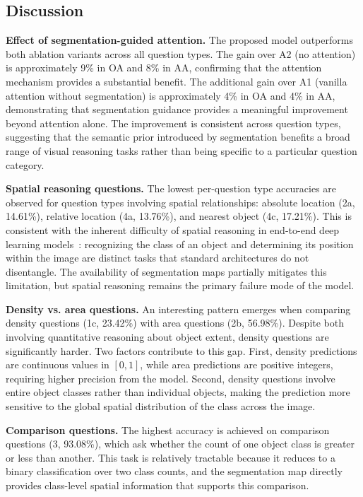 \subsection{Discussion}
\label{sec:chap4_discussion}

\textbf{Effect of segmentation-guided attention.}
The proposed model outperforms both ablation variants
across all question types. The gain over A2 (no attention)
is approximately 9\% in OA and 8\% in AA, confirming that
the attention mechanism provides a substantial benefit.
The additional gain over A1 (vanilla attention without
segmentation) is approximately 4\% in OA and 4\% in AA,
demonstrating that segmentation guidance provides a
meaningful improvement beyond attention alone. The
improvement is consistent across question types, suggesting
that the semantic prior introduced by segmentation benefits
a broad range of visual reasoning tasks rather than
being specific to a particular question category.

\textbf{Spatial reasoning questions.}
The lowest per-question type accuracies are observed for
question types involving spatial relationships: absolute
location (2a, 14.61\%), relative location (4a, 13.76\%),
and nearest object (4c, 17.21\%). This is consistent with
the inherent difficulty of spatial reasoning in end-to-end
deep learning models~\cite{cui2019multiscale}: recognizing
the class of an object and determining its position within
the image are distinct tasks that standard architectures
do not disentangle. The availability of segmentation maps
partially mitigates this limitation, but spatial reasoning
remains the primary failure mode of the model.

\textbf{Density vs. area questions.}
An interesting pattern emerges when comparing density
questions (1c, 23.42\%) with area questions (2b, 56.98\%).
Despite both involving quantitative reasoning about object
extent, density questions are significantly harder. Two
factors contribute to this gap. First, density predictions
are continuous values in $[0, 1]$, while area predictions
are positive integers, requiring higher precision from the
model. Second, density questions involve entire object
classes rather than individual objects, making the
prediction more sensitive to the global spatial
distribution of the class across the image.

\textbf{Comparison questions.}
The highest accuracy is achieved on comparison questions
(3, 93.08\%), which ask whether the count of one object
class is greater or less than another. This task is
relatively tractable because it reduces to a binary
classification over two class counts, and the segmentation
map directly provides class-level spatial information that
supports this comparison.

